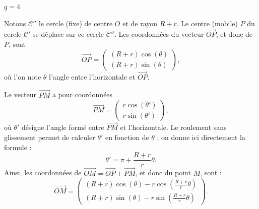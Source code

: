\documentclass[11pt,class=report,crop=false]{standalone}
\begin{document}
\begin{exemple}
\begin{center}
\begin{minipage}{0.32\textwidth}
		$q=4$
	\end{minipage}
\end{center}


Notons $\mathcal{C}''$ le cercle (fixe) de centre $O$ et de rayon $R+r$.
Le centre (mobile) $P$ du cercle $\mathcal{C}'$ se déplace sur ce cercle $\mathcal{C}''$. Les coordonnées du vecteur $\vec{OP}$, et donc de $P$, sont 
$$\vec{OP} = \begin{pmatrix}(R+r)\cos(\theta) \\ (R+r)\sin(\theta)\end{pmatrix},$$
où l'on note $\theta$ l'angle entre  l'horizontale et $\vec{OP}$.


Le vecteur $\vec{PM}$ a pour coordonnées 
$$\vec{PM} = \begin{pmatrix}r\cos(\theta') \\ r\sin(\theta') \end{pmatrix},$$
où $\theta'$ désigne l'angle formé entre $\vec{PM}$ et l'horizontale. Le roulement sans glissement permet de calculer $\theta'$ en fonction de $\theta$ ; on donne ici directement la formule :
$$\theta' = \pi + \frac{R+r}{r}\theta.$$
Ainsi, les coordonnées de $\vec{OM} = \vec{OP}+\vec{PM}$, et donc du point $M$, sont :
$$\vec{OM} = 
\begin{pmatrix}
	(R+r)\cos(\theta) - r\cos\left(\frac{R+r}{r}\theta \right)  \\ 
	(R+r)\sin(\theta) - r\sin\left(\frac{R+r}{r}\theta \right)
\end{pmatrix}.$$
\end{exemple}	
\end{document}
